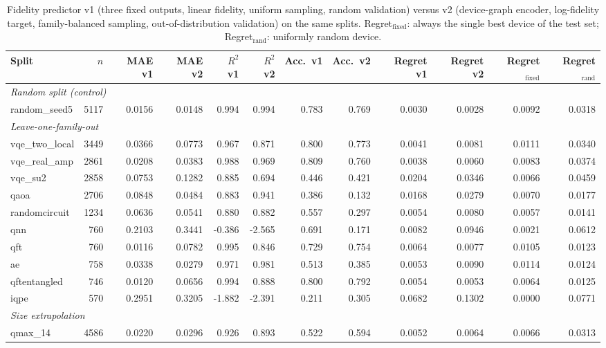 \begin{table}[t]
\centering
\caption{Fidelity predictor v1 (three fixed outputs, linear fidelity, uniform sampling, random validation) versus v2 (device-graph encoder, log-fidelity target, family-balanced sampling, out-of-distribution validation) on the same splits. Regret$_\text{fixed}$: always the single best device of the test set; Regret$_\text{rand}$: uniformly random device.}
\label{tab:ml4qc:generalization-v2}
\begin{tabular}{lrrrrrrrrrrr}
\toprule
Split & $n$ & MAE v1 & MAE v2 & $R^2$ v1 & $R^2$ v2 & Acc.\ v1 & Acc.\ v2 & Regret v1 & Regret v2 & Regret$_\text{fixed}$ & Regret$_\text{rand}$ \\
\midrule
\multicolumn{12}{l}{\textit{Random split (control)}} \\
random\_seed5 & 5117 & 0.0156 & 0.0148 & 0.994 & 0.994 & 0.783 & 0.769 & 0.0030 & 0.0028 & 0.0092 & 0.0318 \\
\midrule
\multicolumn{12}{l}{\textit{Leave-one-family-out}} \\
vqe\_two\_local & 3449 & 0.0366 & 0.0773 & 0.967 & 0.871 & 0.800 & 0.773 & 0.0041 & 0.0081 & 0.0111 & 0.0340 \\
vqe\_real\_amp & 2861 & 0.0208 & 0.0383 & 0.988 & 0.969 & 0.809 & 0.760 & 0.0038 & 0.0060 & 0.0083 & 0.0374 \\
vqe\_su2 & 2858 & 0.0753 & 0.1282 & 0.885 & 0.694 & 0.446 & 0.421 & 0.0204 & 0.0346 & 0.0066 & 0.0459 \\
qaoa & 2706 & 0.0848 & 0.0484 & 0.883 & 0.941 & 0.386 & 0.132 & 0.0168 & 0.0279 & 0.0070 & 0.0177 \\
randomcircuit & 1234 & 0.0636 & 0.0541 & 0.880 & 0.882 & 0.557 & 0.297 & 0.0054 & 0.0080 & 0.0057 & 0.0141 \\
qnn & 760 & 0.2103 & 0.3441 & -0.386 & -2.565 & 0.691 & 0.171 & 0.0082 & 0.0946 & 0.0021 & 0.0612 \\
qft & 760 & 0.0116 & 0.0782 & 0.995 & 0.846 & 0.729 & 0.754 & 0.0064 & 0.0077 & 0.0105 & 0.0123 \\
ae & 758 & 0.0338 & 0.0279 & 0.971 & 0.981 & 0.513 & 0.385 & 0.0053 & 0.0090 & 0.0114 & 0.0124 \\
qftentangled & 746 & 0.0120 & 0.0656 & 0.994 & 0.888 & 0.800 & 0.792 & 0.0054 & 0.0053 & 0.0064 & 0.0125 \\
iqpe & 570 & 0.2951 & 0.3205 & -1.882 & -2.391 & 0.211 & 0.305 & 0.0682 & 0.1302 & 0.0000 & 0.0771 \\
\midrule
\multicolumn{12}{l}{\textit{Size extrapolation}} \\
qmax\_14 & 4586 & 0.0220 & 0.0296 & 0.926 & 0.893 & 0.522 & 0.594 & 0.0052 & 0.0064 & 0.0066 & 0.0313 \\
\bottomrule
\end{tabular}
\end{table}
